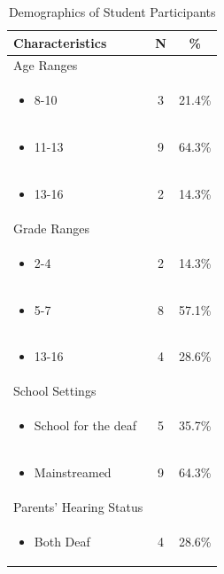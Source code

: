 \documentclass[11.5pt]{sig-alternate} %
\begin{document}
\begin{large}
\begin{table}[ht]
\caption{Demographics of Student Participants}
\begin{tabular}{|l|c|c|}
\hline
Characteristics & N & \% \\ \hline
Age Ranges & & \\
\begin{itemize}[noitemsep, topsep=0pt] \item 8-10 \end{itemize} & 3 & 21.4\% \\
\begin{itemize}[noitemsep, topsep=0pt] \item 11-13 \end{itemize} & 9 & 64.3\% \\
\begin{itemize}[noitemsep, topsep=0pt] \item 13-16 \end{itemize} & 2 & 14.3\% \\ \hline
Grade Ranges & & \\
\begin{itemize}[noitemsep, topsep=0pt] \item 2-4 \end{itemize} & 2 & 14.3\% \\
\begin{itemize}[noitemsep, topsep=0pt] \item 5-7 \end{itemize} & 8 & 57.1\% \\
\begin{itemize}[noitemsep, topsep=0pt] \item 13-16 \end{itemize} & 4 & 28.6\% \\ \hline
School Settings & & \\
\begin{itemize}[noitemsep, topsep=0pt] \item School for the deaf \end{itemize} & 5 & 35.7\% \\
\begin{itemize}[noitemsep, topsep=0pt] \item Mainstreamed \end{itemize} & 9 & 64.3\% \\ \hline
Parents' Hearing Status & & \\
\begin{itemize}[noitemsep, topsep=0pt] \item Both Deaf \end{itemize} & 4 & 28.6\% \\

\end{tabular}
\end{table}
\end{large}
\end{document}
